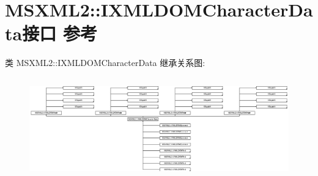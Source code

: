 \hypertarget{interface_m_s_x_m_l2_1_1_i_x_m_l_d_o_m_character_data}{}\section{M\+S\+X\+M\+L2\+:\+:I\+X\+M\+L\+D\+O\+M\+Character\+Data接口 参考}
\label{interface_m_s_x_m_l2_1_1_i_x_m_l_d_o_m_character_data}
类 M\+S\+X\+M\+L2\+:\+:I\+X\+M\+L\+D\+O\+M\+Character\+Data 继承关系图\+:\begin{figure}[H]
\begin{center}
\leavevmode
\includegraphics[height=4.414414cm]{interface_m_s_x_m_l2_1_1_i_x_m_l_d_o_m_character_data}
\end{center}
\end{figure}
